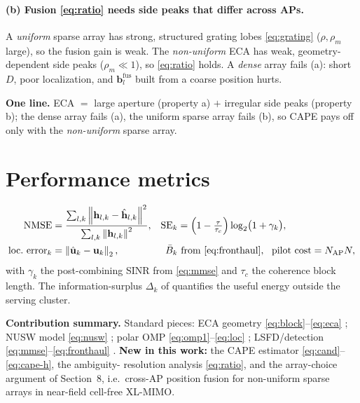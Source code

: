 \documentclass[11pt]{article}
\newcommand{\norm}[1]{\left\|#1\right\|}
\newcommand{\vh}{\mathbf{h}}
\newcommand{\vb}{\mathbf{b}}
\begin{document}
\paragraph{(b) Fusion \eqref{eq:ratio} needs side peaks that differ across APs.}
A \emph{uniform} sparse array has strong, structured grating lobes \eqref{eq:grating}
($\rho,\rho_m$ large), so the fusion gain is weak. The \emph{non-uniform} ECA has weak,
geometry-dependent side peaks ($\rho_m\!\ll\!1$), so \eqref{eq:ratio} holds. A \emph{dense} array
fails (a): short $D$, poor localization, and $\vb_l^{\mathrm{fus}}$ built from a coarse position hurts.

\begin{keybox}
\textbf{One line.} ECA $=$ large aperture (property a) $+$ irregular side peaks (property b);
the dense array fails (a), the uniform sparse array fails (b), so CAPE pays off only with the
\emph{non-uniform} sparse array.
\end{keybox}

\section{Performance metrics}

\begin{align}
\text{NMSE}&=\frac{\sum_{l,k}\norm{\vh_{l,k}-\hat{\vh}_{l,k}}^2}{\sum_{l,k}\norm{\vh_{l,k}}^2},
&\text{SE}_k&=\Big(1-\tfrac{\tau}{\tau_c}\Big)\log_2\!\big(1+\gamma_k\big),\label{eq:metrics}\\
\text{loc.\ error}_k&=\norm{\hat{\mathbf u}_k-\mathbf u_k}_2,
&\bar B_k&\ \text{from \eqref{eq:fronthaul}},\ \ \text{pilot cost}=N_{\mathrm{AP}}N,\notag
\end{align}
with $\gamma_k$ the post-combining SINR from \eqref{eq:mmse} and $\tau_c$ the coherence block length.
The information-surplus $\Delta_k$ of \cite{haider2026vtc} quantifies the useful energy outside the
serving cluster.

\begin{contribbox}
\textbf{Contribution summary.} Standard pieces: ECA geometry \eqref{eq:block}--\eqref{eq:eca}
\cite{zhou2025sparse,vaidyanathan2011coprime}; NUSW model \eqref{eq:nusw} \cite{cui2022channel};
polar OMP \eqref{eq:omp1}--\eqref{eq:loc} \cite{tropp2007omp,cui2022channel}; LSFD/detection
\eqref{eq:mmse}--\eqref{eq:fronthaul} \cite{bjornson2020scalable,haider2026icassp,haider2026vtc}.
\textbf{New in this work:} the CAPE estimator \eqref{eq:cand}--\eqref{eq:cape-h}, the ambiguity-
resolution analysis \eqref{eq:ratio}, and the array-choice argument of Section~8, i.e.\ cross-AP
position fusion for non-uniform sparse arrays in near-field cell-free XL-MIMO.
\end{contribbox}
\end{document}
